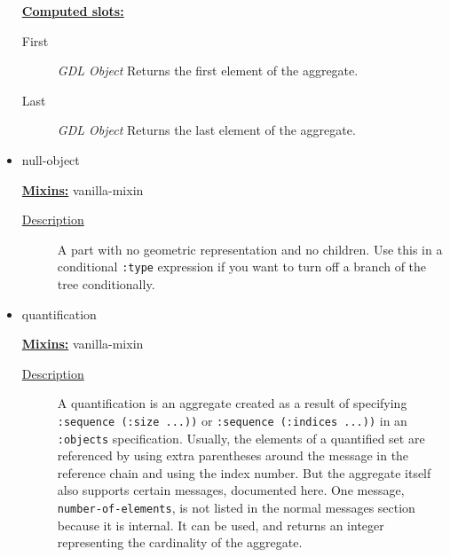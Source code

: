 \documentclass [11pt]{book}
\begin{document}
\begin{itemize}
\textbf{
\underline{Computed slots:}}

\begin{description}

\item [First]
\emph{GDL Object} Returns the first element of the aggregate.


\item [Last]
\emph{GDL Object} Returns the last element of the aggregate.


\end{description}







\item {}null-object


\textbf{
\underline{Mixins:}} vanilla-mixin





\begin{description}

\item [
\underline{Description}]


A part with no geometric representation and no children. Use this in a 
conditional \texttt{:type} expression if you want to turn off a branch of the tree conditionally.



\end{description}









\item {}quantification


\textbf{
\underline{Mixins:}} vanilla-mixin





\begin{description}

\item [
\underline{Description}]


A quantification is an aggregate created as a result of specifying \texttt{:sequence (:size ...))} or
\texttt{:sequence (:indices ...))} in an \texttt{:objects} specification. Usually, the elements of a quantified set are referenced by using
extra parentheses around the message in the reference chain and using the index number. But the aggregate itself also supports certain
messages, documented here. One message, \texttt{number-of-elements}, is not listed in the normal messages section because it is 
internal. It can be used, and returns an integer representing the cardinality of the aggregate.




\end{description}
\end{itemize}
\end{document}
